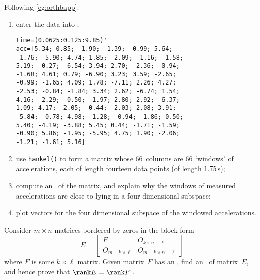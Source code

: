 \begin{exercise}
Following \cref{eg:orthbapp}:
\begin{enumerate}
\item enter the data into \script;
\setbox\ajrqrbox\hbox{}%
\marginajrbox%
\begin{verbatim}
time=(0.0625:0.125:9.85)'
acc=[5.34; 0.85; -1.90; -1.39; -0.99; 5.64;
-1.76; -5.90; 4.74; 1.85; -2.09; -1.16; -1.58;
5.19; -0.27; -6.54; 3.94; 2.70; -2.36; -0.94;
-1.68; 4.61; 0.79; -6.90; 3.23; 3.59; -2.65;
-0.99; -1.65; 4.09; 1.78; -7.11; 2.26; 4.27;
-2.53; -0.84; -1.84; 3.34; 2.62; -6.74; 1.54;
4.16; -2.29; -0.50; -1.97; 2.80; 2.92; -6.37;
1.09; 4.17; -2.05; -0.44; -2.03; 2.08; 3.91;
-5.84; -0.78; 4.98; -1.28; -0.94; -1.86; 0.50;
5.40; -4.19; -3.88; 5.45; 0.44; -1.71; -1.59;
-0.90; 5.86; -1.95; -5.95; 4.75; 1.90; -2.06;
-1.21; -1.61; 5.16]
\end{verbatim}
\item use \verb|hankel()|  to form a matrix whose 66~columns are 66 `windows' of accelerations, each of length fourteen data points (of length \(1.75\)\,s);

\item compute an \svd\ of the matrix, and explain why the windows of measured accelerations are close to lying in a four dimensional subspace;

\item plot  vectors for the four dimensional subspace of the windowed accelerations.
\end{enumerate}
\end{exercise}







\begin{exercise} \label{ex:rankobord} 
Consider \(m\times n\) matrices bordered by zeros in the block form
\begin{equation*}
E=\begin{bmatrix} F&O_{k\times n-\ell}
\\O_{m-k\times \ell}& O_{m-k\times n-\ell} \end{bmatrix}
\end{equation*}
where \(F\) is some \(k\times\ell\) matrix.
Given matrix~\(F\) has an \svd, find an \svd\ of matrix~\(E\), and hence prove that \(\rank E=\rank F\)\,.
\end{exercise}

